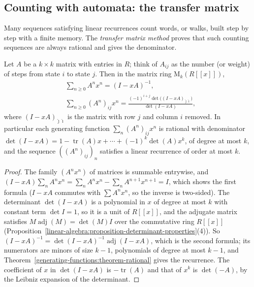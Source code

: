 \subsection{Counting with automata: the transfer matrix}\label{generating-functions:subsection-transfer-matrix}

Many sequences satisfying linear recurrences count words, or walks, built step by step with a finite memory. The \emph{transfer matrix method} proves that such counting sequences are always
rational and gives the denominator.

\begin{theorem}\label{generating-functions:theorem-transfer-matrix}
Let $A$ be a $k \times k$ matrix with entries in $R$; think of $A_{ij}$ as the number (or weight) of steps from state $i$ to state $j$. Then in the matrix ring $\mathrm{M}_k(R[[x]])$,
\[
\begin{aligned}
&\sum_{n \geq 0}A^nx^n = (I - xA)^{-1},\\
&\sum_{n \geq 0}(A^n)_{ij}x^n = \frac{(-1)^{i+j}\det\bigl((I - xA)_{\hat{\jmath}\hat{\imath}}\bigr)}{\det(I - xA)},
\end{aligned}
\]
where $(I - xA)_{\hat{\jmath}\hat{\imath}}$ is the matrix with row $j$ and column $i$ removed. In particular each generating function $\sum_n(A^n)_{ij}x^n$ is rational with denominator
$\det(I - xA) = 1 - \operatorname{tr}(A)x + \cdots + (-1)^k\det(A)x^k$, of degree at most $k$, and the sequence $((A^n)_{ij})_n$ satisfies a linear recurrence of order at most $k$.
\end{theorem}

\begin{proof}
The family $(A^nx^n)$ of matrices is summable entrywise, and $(I - xA)\sum_nA^nx^n = \sum_nA^nx^n - \sum_nA^{n+1}x^{n+1} = I$, which shows the first formula ($I - xA$ commutes with $\sum A^nx^n$, so the
inverse is two-sided). The determinant $\det(I - xA)$ is a polynomial in $x$ of degree at most $k$ with constant term $\det I = 1$, so it is a unit of $R[[x]]$, and the adjugate matrix satisfies
$M\operatorname{adj}(M) = \det(M)I$ over the commutative ring $R[[x]]$ (Proposition~\ref{linear-algebra:proposition-determinant-properties}(4)). So
$(I - xA)^{-1} = \det(I - xA)^{-1}\operatorname{adj}(I - xA)$, which is the second formula; its numerators are minors of size $k - 1$, polynomials of degree at most $k - 1$, and
Theorem~\ref{generating-functions:theorem-rational} gives the recurrence. The coefficient of $x$ in $\det(I - xA)$ is $-\operatorname{tr}(A)$ and that of $x^k$ is $\det(-A)$, by the Leibniz
expansion of the determinant.
\end{proof}

